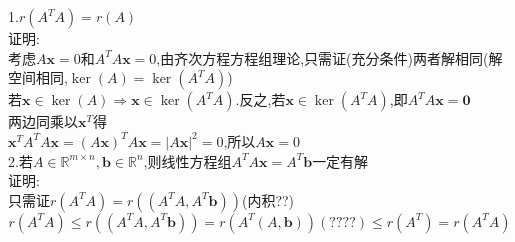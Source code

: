\documentclass[11pt, a4paper, UTF8]{ctexart}
\begin{document}
\section{}
\subsection{}
1.$r(A^TA)=r(A)$\\
证明:\\
考虑$A\bm x=0$和$A^TA\bm x=0$,由齐次方程方程组理论,只需证(充分条件)两者解相同(解空间相同,$\ker(A)=\ker(A^TA)$)\\
若$\bm x\in\ker(A)\Rightarrow\bm x\in\ker(A^TA)$.反之,若$\bm x\in\ker(A^TA)$,即$A^TA\bm x=\bm0$\\
两边同乘以$\bm x^T$得\\
$\bm x^TA^TA\bm x=(A\bm x)^TA\bm x=|A\bm x|^2=0$,所以$A\bm x=0$\\
2.若$A\in\mathbb{R}^{m\times n},\bm b\in\mathbb{R}^n$,则线性方程组$A^TA\bm x=A^T\bm b$一定有解\\
证明:\\
只需证$r(A^TA)=r((A^TA,A^T\bm b))$(内积??)\\
\[r(A^TA)\le r((A^TA,A^T\bm b))=r(A^T(A,\bm b))(????)\le r(A^T)=r(A^TA)\]
\end{document}
